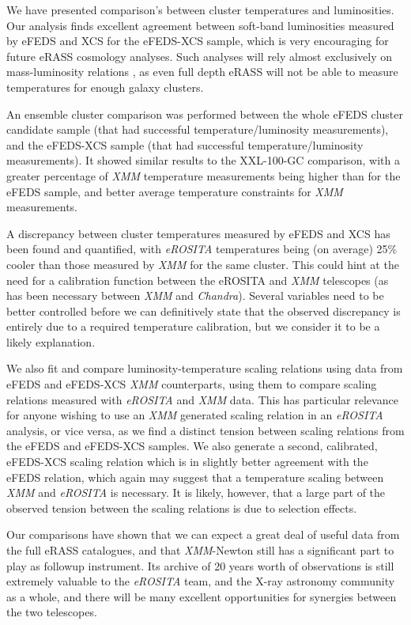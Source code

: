 \documentclass[fleqn,usenatbib]{mnras}
\begin{document}
We have presented comparison's between cluster temperatures and luminosities. Our analysis finds excellent agreement between soft-band luminosities measured by eFEDS and XCS for the eFEDS-XCS sample, which is very encouraging for future eRASS cosmology analyses. Such analyses will rely almost exclusively on mass-luminosity relations \citep[such as the eFEDS-HSC collaboration, ][]{efedsmor}, as even full depth eRASS will not be able to measure temperatures for enough galaxy clusters. 

An ensemble cluster comparison was performed between the whole eFEDS cluster candidate sample (that had successful temperature/luminosity measurements), and the eFEDS-XCS sample (that had successful temperature/luminosity measurements). It showed similar results to the XXL-100-GC comparison, with a greater percentage of {\em XMM} temperature measurements being higher than for the eFEDS sample, and better average temperature constraints for {\em XMM} measurements.

A discrepancy between cluster temperatures measured by eFEDS and XCS has been found and quantified, with {\em eROSITA} temperatures being (on average) 25\% cooler than those measured by {\em XMM} for the same cluster. This could hint at the need for a calibration function between the eROSITA and {\em XMM} telescopes (as has been necessary between {\em XMM} and {\em Chandra}). Several variables need to be better controlled before we can definitively state that the observed discrepancy is entirely due to a required temperature calibration, but we consider it to be a likely explanation. 

We also fit and compare luminosity-temperature scaling relations using data from eFEDS and eFEDS-XCS {\em XMM} counterparts, using them to compare scaling relations measured with {\em eROSITA} and {\em XMM} data. This has particular relevance for anyone wishing to use an {\em XMM} generated scaling relation in an {\em eROSITA} analysis, or vice versa, as we find a distinct tension between scaling relations from the eFEDS and eFEDS-XCS samples. We also generate a second, calibrated, eFEDS-XCS scaling relation which is in slightly better agreement with the eFEDS relation, which again may suggest that a temperature scaling between {\em XMM} and {\em eROSITA} is necessary. It is likely, however, that a large part of the observed tension between the scaling relations is due to selection effects.

Our comparisons have shown that we can expect a great deal of useful data from the full eRASS catalogues, and that {\em XMM}-Newton still has a significant part to play as followup instrument. Its archive of 20 years worth of observations is still extremely valuable to the {\em eROSITA} team, and the X-ray astronomy community as a whole, and there will be many excellent opportunities for synergies between the two telescopes.
\end{document}

